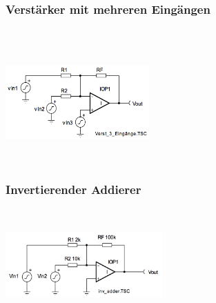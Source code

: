 		\subsubsection{Verstärker mit mehreren Eingängen }
			\begin{minipage}{12.5cm}
            	\hspace*{10mm}
            	\hspace{15mm}\\
            	\hspace*{10mm}\\
            	\hspace*{10mm}
            \end{minipage}
			\begin{minipage}{5.5cm}
            	\includegraphics[width=5.5cm]{./bilder/3-eingaenge.png}
            \end{minipage}\\

		\subsubsection{Invertierender Addierer }
			\begin{minipage}[b]{12cm}
            \hspace*{10mm}\\
            \hspace*{10mm}
           	\hspace*{10mm}
            \end{minipage}
			\begin{minipage}{6cm}
            	\includegraphics[width=6cm]{./bilder/invertadd.png}
            \end{minipage}\\

